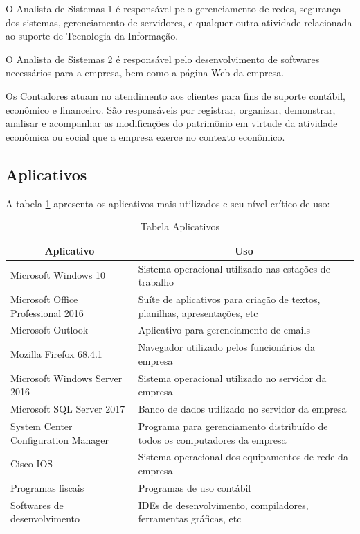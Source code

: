 \documentclass[	DIV=calc,%
							paper=a4,%
							fontsize=12pt,%
							onecolumn]{scrartcl}	 					%
\begin{document}
O Analista de Sistemas 1 é responsável pelo gerenciamento de redes, segurança dos sistemas, gerenciamento de servidores, e qualquer outra atividade relacionada ao suporte de Tecnologia da Informação.

O Analista de Sistemas 2 é responsável pelo desenvolvimento de softwares necessários para a empresa, bem como a página Web da empresa.

Os Contadores atuam no atendimento aos clientes para fins de suporte contábil, econômico e financeiro. São responsáveis por registrar, organizar, demonstrar, analisar e acompanhar as modificações do patrimônio em virtude da atividade econômica ou social que a empresa exerce no contexto econômico.

\subsection{Aplicativos}

A tabela \ref{tab:aplicativos} apresenta os aplicativos mais utilizados e seu nível crítico de uso:

\begin{table}[]
	\begin{tabular}{|p{6cm}|p{10cm}|}
		\hline
		\multicolumn{1}{|c|}{\textbf{Aplicativo}} & \multicolumn{1}{c|}{\textbf{Uso}}                                           \\ \hline
		Microsoft Windows 10                      & Sistema operacional utilizado nas estações de trabalho                      \\ \hline
		Microsoft Office Professional 2016        & Suíte de aplicativos para criação de textos, planilhas, apresentações, etc  \\ \hline
		Microsoft Outlook                         & Aplicativo para gerenciamento de emails                                     \\ \hline
		Mozilla Firefox 68.4.1                    & Navegador utilizado pelos funcionários da empresa                           \\ \hline
		Microsoft Windows Server 2016             & Sistema operacional utilizado no servidor da empresa                        \\ \hline
		Microsoft SQL Server 2017                 & Banco de dados utilizado no servidor da empresa                             \\ \hline
		System Center Configuration Manager       & Programa para gerenciamento distribuído de todos os computadores da empresa \\ \hline
		Cisco IOS                                 & Sistema operacional dos equipamentos de rede da empresa                     \\ \hline
		Programas fiscais                         & Programas de uso contábil                                                   \\ \hline
		Softwares de desenvolvimento              & IDEs de desenvolvimento, compiladores, ferramentas gráficas, etc            \\ \hline
	\end{tabular}
	\caption{Tabela Aplicativos}
	\label{tab:aplicativos}
\end{table}
\end{document}
